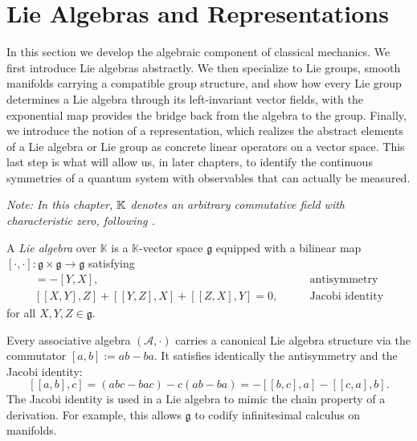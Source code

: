 

\section{Lie Algebras and Representations}
In this section we develop the algebraic component of classical mechanics. We first introduce Lie algebras abstractly. We then specialize to Lie groups, smooth manifolds carrying a compatible group structure, and show how every Lie group determines a Lie algebra through its left-invariant vector fields, with the exponential map provides the bridge back from the algebra to the group. Finally, we introduce the notion of a representation, which realizes the abstract elements of a Lie algebra or Lie group as concrete linear operators on a vector space. This last step is what will allow us, in later chapters, to identify the continuous symmetries of a quantum system with observables that can actually be measured.

\textit{Note: In this chapter, $\mathbb{K}$ denotes an arbitrary commutative field with characteristic zero, following \cite{humphreysIntroductionLieAlgebras2010}.}

\begin{definition}\label{def:lie-algebra}
	A \emph{Lie algebra} over $\mathbb{K}$ is a $\mathbb{K}$-vector space $\mathfrak{g}$ equipped with a bilinear map $[\cdot,\cdot]:\mathfrak{g}\times\mathfrak{g}\to\mathfrak{g}$ satisfying
	\begin{align}
	[X,Y] = -[Y,X], \qquad &\text{antisymmetry} \\
	[[X,Y],Z]+[[Y,Z],X]+[[Z,X],Y]=0, \qquad &\text{Jacobi identity}
	\end{align}
	for all $X,Y,Z\in\mathfrak{g}$. 
\end{definition}

\begin{remark}
	Every associative algebra $(\mathcal{A},\cdot)$ carries a canonical Lie algebra
	structure via the commutator $[a,b]:=ab-ba$. It satisfies identically the antisymmetry and the Jacobi identity:
	\[
		[[a,b],c] = (abc - bac) - c(ab - ba) = -[[b,c],a] - [[c,a],b].
	\]
	The Jacobi identity is used in a Lie algebra to mimic the chain property of a derivation. For example, this allows $\mathfrak{g}$ to codify infinitesimal calculus on manifolds.
\end{remark}

